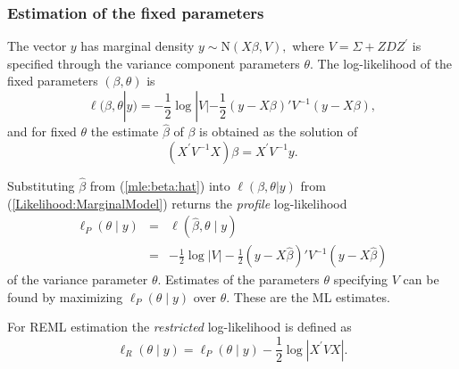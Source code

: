 \documentclass[12pt, a4paper]{report}
\theoremstyle{plain}
\theoremstyle{definition}
\theoremstyle{remark}
\begin{document}
	
	
	\subsubsection{Estimation of the fixed parameters}
	
	The vector $y$ has marginal density $y \sim \mathrm{N}(X \beta,V),$ where $V = \Sigma + ZDZ^\prime$ is specified through the variance component parameters $\theta.$ The log-likelihood of the fixed parameters $(\beta, \theta)$ is
	\begin{equation}
	\ell (\beta, \theta|y) =
	-\frac{1}{2} \log |V| -\frac{1}{2}(y -
	X \beta)'V^{-1}(y -
	X \beta), \label{Likelihood:MarginalModel}
	\end{equation}
	and for fixed $\theta$ the estimate $\hat{\beta}$ of $\beta$ is obtained as the solution of
	\begin{equation}
	(X^\prime V^{-1}X) {\beta} = X^\prime V^{-1}y.
	\label{mle:beta:hat}
	\end{equation}
	
	Substituting $\hat{\beta}$ from (\ref{mle:beta:hat}) into $\ell(\beta, \theta|y)$ from (\ref{Likelihood:MarginalModel}) returns the \emph{profile} log-likelihood
	\begin{eqnarray*}
		\ell_P(\theta \mid y) &=& \ell(\hat{\beta}, \theta \mid y) \\
		&=& -\frac{1}{2} \log |V| -\frac{1}{2}(y - X \hat{\beta})'V^{-1}(y - X \hat{\beta})
	\end{eqnarray*}
	of the variance parameter $\theta.$ Estimates of the parameters $\theta$ specifying $V$ can be found by maximizing $\ell_P(\theta \mid y)$ over $\theta.$ These are the ML estimates.
	
	For REML estimation the \emph{restricted} log-likelihood is defined as
	\[
	\ell_R(\theta \mid y) =
	\ell_P(\theta \mid y) -\frac{1}{2} \log |X^\prime VX |.
	\]
	
\end{document}

